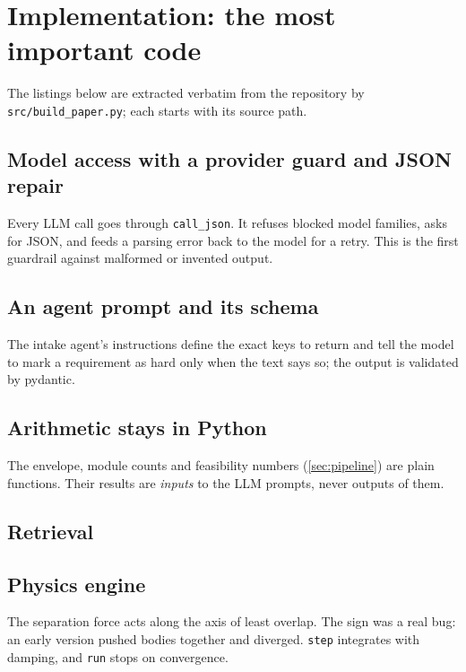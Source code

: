 \documentclass[10pt,a4paper]{article}
\newcommand{\code}[1]{\texttt{\small #1}}
\theoremstyle{definition}
\begin{document}
\clearpage
\section{Implementation: the most important code}
\label{sec:code}

The listings below are extracted verbatim from the repository by \code{src/build\_paper.py}; each starts with its source
path.

\subsection{Model access with a provider guard and JSON repair}
Every LLM call goes through \code{call\_json}. It refuses blocked model families, asks for JSON, and feeds a parsing
error back to the model for a retry. This is the first guardrail against malformed or invented output.


\subsection{An agent prompt and its schema}
The intake agent's instructions define the exact keys to return and tell the model to mark a requirement as hard only
when the text says so; the output is validated by pydantic.


\subsection{Arithmetic stays in Python}
The envelope, module counts and feasibility numbers (\cref{sec:pipeline}) are plain functions. Their results are
\emph{inputs} to the LLM prompts, never outputs of them.




\subsection{Retrieval}


\subsection{Physics engine}
The separation force acts along the axis of least overlap. The sign was a real bug: an early version pushed bodies
together and diverged. \code{step} integrates with damping, and \code{run} stops on convergence.

\end{document}
